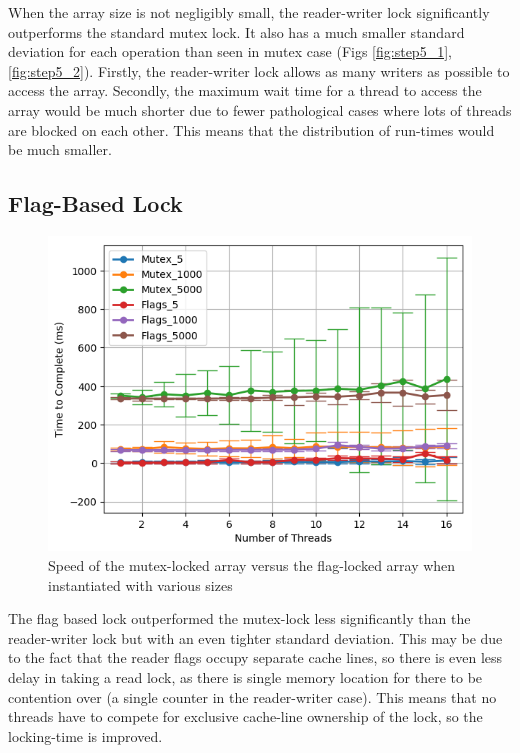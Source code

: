 \documentclass[11pt]{article}
\begin{document}
When the array size is not negligibly small, the reader-writer lock significantly outperforms the standard mutex lock. It also has a much smaller standard deviation for each operation than seen in mutex case (Figs \ref{fig:step5_1}, \ref{fig:step5_2}). Firstly, the reader-writer lock allows as many writers as possible to access the array. Secondly, the maximum wait time for a thread to access the array would be much shorter due to fewer pathological cases where lots of threads are blocked on each other. This means that the distribution of run-times would be much smaller.


\subsection{Flag-Based Lock}

\begin{figure}
\centering
\includegraphics[scale=0.65]{step6_1.png}
\caption{Speed of the mutex-locked array versus the flag-locked array when instantiated with various sizes}
\label{fig:step6_1}
\end{figure}

The flag based lock outperformed the mutex-lock less significantly than the reader-writer lock but with an even tighter standard deviation. This may be due to the fact that the reader flags occupy separate cache lines, so there is even less delay in taking a read lock, as there is single memory location for there to be contention over (a single counter in the reader-writer case). This means that no threads have to compete for exclusive cache-line ownership of the lock, so the locking-time is improved.
\end{document}
